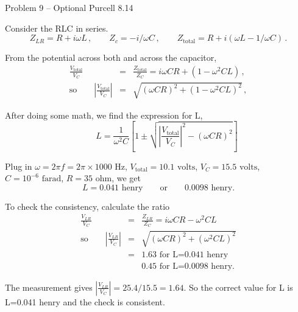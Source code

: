 \documentclass[makesolutionspdf]{esg8022pset}
\begin{document}
\begin{problem}{Problem 9 -- Optional Purcell 8.14}
\end{problem}
\begin{solution}
Consider the RLC in series.  
\begin{equation}
Z_{LR}=R+i\omega L\,,\qquad Z_c=-i/\omega C\,,\qquad
Z_{\textrm{total}}=R+i(\omega L-1/\omega C)\,.
\end{equation}

From the potential across both and across the capacitor,
\begin{eqnarray}
\frac{V_{\textrm{total}}}{V_C}&=&\frac{Z_{\textrm{total}}}{Z_C}=i\omega
CR+(1-\omega^2 CL)\,,\\
\textrm{so}\qquad \left| \frac{V_{\textrm{total}}}{V_C}\right| &=&
\sqrt{(\omega CR)^2+(1-\omega^2 CL)^2}\,,
\end{eqnarray}

After doing some math, we find the expression for L,
\begin{equation}
\qquad L = \frac{1}{\omega^2 C}\left[
1\pm \sqrt{\left|\frac{V_{\textrm{total}}}{V_C}\right|^2-(\omega CR)^2}
\right]
\end{equation}

Plug in $\omega=2\pi f=2\pi\times 1000\textrm{ Hz}$,
$V_{\textrm{total}}=10.1\textrm{ volts}$, $V_C=15.5\textrm{ volts}$,
$C=10^{-6}\textrm{ farad}$, $R=35\textrm{ ohm}$, we get 
\[ L= 0.041 \textrm{ henry}\qquad\textrm{or}\qquad 0.0098\textrm{ henry}.\]

To check the consistency, calculate the ratio
\begin{eqnarray}
\frac{V_{LR}}{V_C}&=&\frac{Z_{LR}}{Z_C}=i\omega CR-\omega^2 CL\\
\textrm{so}\qquad \left|\frac{V_{LR}}{V_C}\right| &=& \sqrt{(\omega
CR)^2+(\omega^2 CL)^2}\\
&=& 1.63 \textrm{ for L=0.041 henry}\nonumber\\
& & 0.45\textrm{ for L=0.0098 henry}.
\end{eqnarray}

The measurement gives $\left|\frac{V_{LR}}{V_C}\right| =
25.4/15.5=1.64$.  So the correct value for L is L=0.041 henry and the
check is consistent.
\end{solution}
\end{document}
